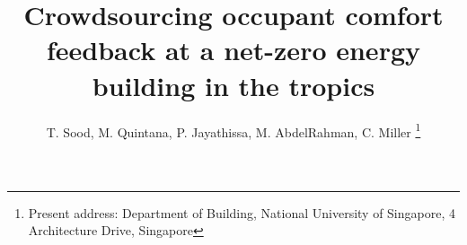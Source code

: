 \documentclass[a4paper]{jpconf} %
\begin{document}



\title{Crowdsourcing occupant comfort feedback at a net-zero energy building in the tropics} 

 \author{ T. Sood, M. Quintana,
 P. Jayathissa, M. AbdelRahman, C. Miller \footnote[1]{Present address:
 Department of Building, National University of Singapore, 4 Architecture Drive, Singapore}}


 \address{Building and Urban Data Science (BUDS) Group,  Department of Building, School of Design and Environment (SDE), National University of Singapore (NUS), Singapore}








\end{document}

